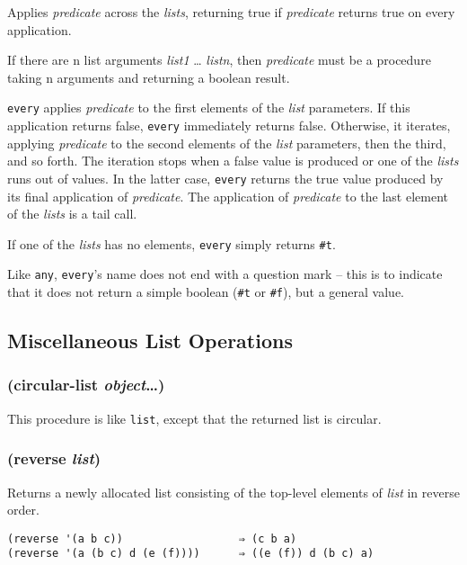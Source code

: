 \documentclass{article}
\begin{document}
Applies \emph{predicate} across the \emph{lists}, returning true if \emph{predicate} returns
true on every application.

If there are n list arguments \emph{list1} \ldots{} \emph{listn}, then \emph{predicate} must
be a procedure taking n arguments and returning a boolean result.

\verb|every| applies \emph{predicate} to the first elements of the \emph{list} parameters.
If this application returns false, \verb|every| immediately returns false. Otherwise, it
iterates, applying \emph{predicate} to the second elements of the \emph{list} parameters, then
the third, and so forth. The iteration stops when a false value is produced or one of the
\emph{lists} runs out of values. In the latter case, \verb|every| returns the true value
produced by its final application of \emph{predicate}. The application of \emph{predicate} to
the last element of the \emph{lists} is a tail call.

If one of the \emph{lists} has no elements, \verb|every| simply returns \verb|#t|.

Like \verb|any|, \verb|every|'s name does not end with a question mark -- this is to
indicate that it does not return a simple boolean (\verb|#t| or \verb|#f|), but a
general value.

\subsection{Miscellaneous List Operations}\label{sec:miscellaneous-list-operations}

\subsubsection{(circular-list \emph{object}\ldots{})}

This procedure is like \verb|list|, except that the returned list is circular.

\subsubsection{(reverse \emph{list})}

Returns a newly allocated list consisting of the top-level elements of \emph{list} in reverse
order.

\begin{verbatim}
(reverse '(a b c))                  ⇒ (c b a)
(reverse '(a (b c) d (e (f))))      ⇒ ((e (f)) d (b c) a)
\end{verbatim}
\end{document}
